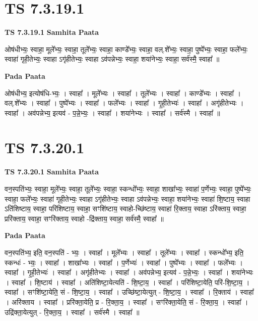 \documentclass[17pt]{extarticle}
\begin{document}
\section*{ TS 7.3.19.1 }

\textbf{TS 7.3.19.1 } \newline
\textbf{Samhita Paata} \newline

ओष॑धीभ्यः॒ स्वाहा॒ मूले᳚भ्यः॒ स्वाहा॒ तूले᳚भ्यः॒ स्वाहा॒ काण्डे᳚भ्यः॒ स्वाहा॒ वल्.शे᳚भ्यः॒ स्वाहा॒ पुष्पे᳚भ्यः॒ स्वाहा॒ फले᳚भ्यः॒ स्वाहा॑ गृही॒तेभ्यः॒ स्वाहा ऽगृ॑हीतेभ्यः॒ स्वाहा ऽव॑पन्नेभ्यः॒ स्वाहा॒ शया॑नेभ्यः॒ स्वाहा॒ सर्व॑स्मै॒ स्वाहा᳚ ॥ \newline

\textbf{Pada Paata} \newline

ओष॑धीभ्य॒ इत्योष॑धि-भ्यः॒ । स्वाहा᳚ । मूले᳚भ्यः । स्वाहा᳚ । तूले᳚भ्यः । स्वाहा᳚ । काण्डे᳚भ्यः । स्वाहा᳚ । वल्.शे᳚भ्यः । स्वाहा᳚ । पुष्पे᳚भ्यः । स्वाहा᳚ । फले᳚भ्यः । स्वाहा᳚ । गृ॒ही॒तेभ्यः॑ । स्वाहा᳚ । अगृ॑हीतेभ्यः । स्वाहा᳚ । अव॑पन्नेभ्य॒ इत्यव॑ - प॒न्ने॒भ्यः॒ । स्वाहा᳚ । शया॑नेभ्यः । स्वाहा᳚ । सर्व॑स्मै । स्वाहा᳚ ॥  \newline




\section*{ TS 7.3.20.1 }

\textbf{TS 7.3.20.1 } \newline
\textbf{Samhita Paata} \newline

वन॒स्पति॑भ्यः॒ स्वाहा॒ मूले᳚भ्यः॒ स्वाहा॒ तूले᳚भ्यः॒ स्वाहा॒ स्कन्धो᳚भ्यः॒ स्वाहा॒ शाखा᳚भ्यः॒ स्वाहा॑ प॒र्णेभ्यः॒ स्वाहा॒ पुष्पे᳚भ्यः॒ स्वाहा॒ फले᳚भ्यः॒ स्वाहा॑ गृही॒तेभ्यः॒ स्वाहा ऽगृ॑हीतेभ्यः॒ स्वाहा ऽव॑पन्नेभ्यः॒ स्वाहा॒ शया॑नेभ्यः॒ स्वाहा॑ शि॒ष्टाय॒ स्वाहा ऽति॑शिष्टाय॒ स्वाहा॒ परि॑शिष्टाय॒ स्वाहा॒ सꣳशि॑ष्टाय॒ स्वाहो-च्छि॑ष्टाय॒ स्वाहा॑ रि॒क्ताय॒ स्वाहा ऽरि॑क्ताय॒ स्वाहा॒ प्ररि॑क्ताय॒ स्वाहा॒ सꣳरि॑क्ताय॒ स्वाहो -द्रि॑क्ताय॒ स्वाहा॒ सर्व॑स्मै॒ स्वाहा᳚ ॥ \newline

\textbf{Pada Paata} \newline

वन॒स्पति॑भ्य॒ इति॒ वन॒स्पति॑ - भ्यः॒ । स्वाहा᳚ । मूले᳚भ्यः । स्वाहा᳚ । तूले᳚भ्यः । स्वाहा᳚ । स्कन्धो᳚भ्य॒ इति॒ स्कन्धः॑ - भ्यः॒ । स्वाहा᳚ । शाखा᳚भ्यः । स्वाहा᳚ । प॒र्णेभ्यः॑ । स्वाहा᳚ । पुष्पे᳚भ्यः । स्वाहा᳚ । फले᳚भ्यः । स्वाहा᳚ । गृ॒ही॒तेभ्यः॑ । स्वाहा᳚ । अगृ॑हीतेभ्यः । स्वाहा᳚ । अव॑पन्नेभ्य॒ इत्यव॑ - प॒न्ने॒भ्यः॒ । स्वाहा᳚ । शया॑नेभ्यः । स्वाहा᳚ । शि॒ष्टाय॑ । स्वाहा᳚ । अति॑शिष्टा॒येत्यति॑ - शि॒ष्टा॒य॒ । स्वाहा᳚ । परि॑शिष्टा॒येति॒ परि॑-शि॒ष्टा॒य॒ । स्वाहा᳚ । सꣳशि॑ष्टा॒येति॒ सं - शि॒ष्टा॒य॒ । स्वाहा᳚ । उच्छि॑ष्टा॒येत्युत् - शि॒ष्टा॒य॒ । स्वाहा᳚ । रि॒क्ताय॑ । स्वाहा᳚ । अरि॑क्ताय । स्वाहा᳚ । प्ररि॑क्ता॒येति॒ प्र - रि॒क्ता॒य॒ । स्वाहा᳚ । सꣳरि॑क्ता॒येति॒ सं - रि॒क्ता॒य॒ । स्वाहा᳚ । उद्रि॑क्ता॒येत्युत् - रि॒क्ता॒य॒ । स्वाहा᳚ । सर्व॑स्मै । स्वाहा᳚ ॥  \newline
\end{document}
